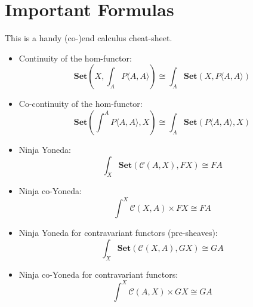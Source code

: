 \documentclass[DaoFP]{subfiles}
\begin{document}
\section{Important Formulas}
This is a handy (co-)end calculus cheat-sheet.
\begin{itemize}
\item Continuity of the hom-functor:
\[ \mathbf{Set}\left(X, \int_A P\langle A, A \rangle \right) \cong \int_A  \mathbf{Set}(X, P\langle A, A \rangle) \]
\item Co-continuity of the hom-functor:
\[ \mathbf{Set}\left( \int^A P\langle A, A \rangle , X\right) \cong \int_A  \mathbf{Set}(P\langle A, A \rangle, X) \]
\item Ninja Yoneda:
\[ \int_{X} \mathbf{Set} (\mathcal{C}(A, X), FX) \cong FA \]
\item Ninja co-Yoneda:
\[ \int^{X} \mathcal{C}(X, A) \times F X \cong F A \]
\item Ninja Yoneda for contravariant functors (pre-sheaves):
\[ \int_{X} \mathbf{Set} (\mathcal{C}(X, A), GX) \cong GA \]
\item Ninja co-Yoneda for contravariant functors:
\[ \int^{X} \mathcal{C}(A, X) \times G X \cong G A \]
\end{itemize}
\end{document}
